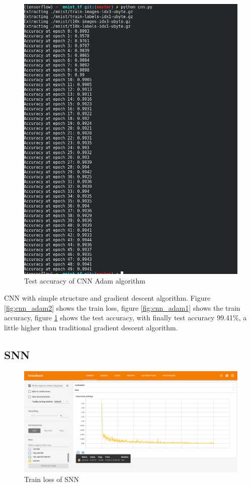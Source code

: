 \documentclass[10pt,twocolumn,letterpaper]{article}
\begin{document}
\begin{CJK}{UTF8}{gbsn}
\begin{figure}
\begin{center}
   \includegraphics[width=0.9\linewidth]{cnn_adam3.png}
\end{center}
\caption{Test accuracy of CNN Adam algorithm}
\label{fig:cnn_adam3}
\end{figure}

CNN with simple structure and gradient descent algorithm. Figure \ref{fig:cnn_adam2} shows the train loss, figure \ref{fig:cnn_adam1} shows the train accuracy, figure \ref{fig:cnn_adam3} shows the test accuracy, with finally test accuracy 99.41\%, a little higher than traditional gradient descent algorithm.

\subsection{SNN}

\begin{figure}
\begin{center}
   \includegraphics[width=0.9\linewidth]{snn2.png}
\end{center}
\caption{Train loss of SNN}
\label{fig:snn2}
\end{figure}


\end{CJK}
\end{document}
